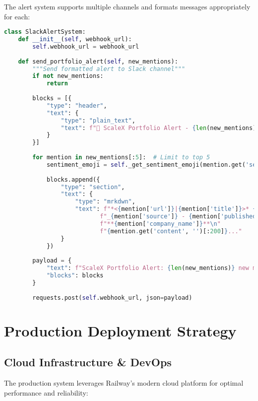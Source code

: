 \documentclass[11pt]{article}
\begin{document}
The alert system supports multiple channels and formats messages appropriately for each:

\begin{lstlisting}[language=Python, caption=Slack Integration for Real-Time Alerts]
class SlackAlertSystem:
    def __init__(self, webhook_url):
        self.webhook_url = webhook_url
    
    def send_portfolio_alert(self, new_mentions):
        """Send formatted alert to Slack channel"""
        if not new_mentions:
            return
        
        blocks = [{
            "type": "header",
            "text": {
                "type": "plain_text",
                "text": f"🚀 ScaleX Portfolio Alert - {len(new_mentions)} New Mentions!"
            }
        }]
        
        for mention in new_mentions[:5]:  # Limit to top 5
            sentiment_emoji = self._get_sentiment_emoji(mention.get('sentiment_score', 0))
            
            blocks.append({
                "type": "section",
                "text": {
                    "type": "mrkdwn",
                    "text": f"*<{mention['url']}|{mention['title']}>* {sentiment_emoji}\n"
                           f"_{mention['source']} - {mention['published_date'][:10]}_\n"
                           f"**{mention['company_name']}**\n"
                           f"{mention.get('content', '')[:200]}..."
                }
            })
        
        payload = {
            "text": f"ScaleX Portfolio Alert: {len(new_mentions)} new mentions",
            "blocks": blocks
        }
        
        requests.post(self.webhook_url, json=payload)
\end{lstlisting}

\section{Production Deployment Strategy}

\subsection{Cloud Infrastructure \& DevOps}

The production system leverages Railway's modern cloud platform for optimal performance and reliability:
\end{document}
